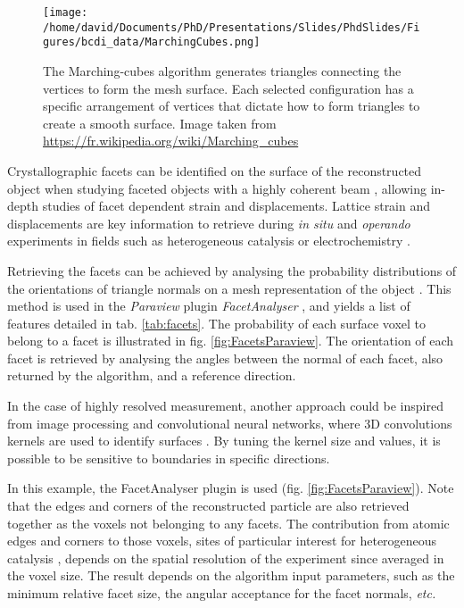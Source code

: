 \begin{figure}[!htb]
    \centering
    \texttt{[image: /home/david/Documents/PhD/Presentations/Slides/PhdSlides/Figures/bcdi\_data/MarchingCubes.png]}
    \caption{
    The Marching-cubes algorithm generates triangles connecting the vertices to form the mesh surface.
    Each selected configuration has a specific arrangement of vertices that dictate how to form triangles to create a smooth surface.
    Image taken from \url{https://fr.wikipedia.org/wiki/Marching_cubes}
    }
    \label{fig:MarchingCubes}
\end{figure}

Crystallographic facets can be identified on the surface of the reconstructed object when studying faceted objects with a highly coherent beam \parencite{Richard2018}, allowing in-depth studies of facet dependent strain and displacements.
Lattice strain and displacements are key information to retrieve during \textit{in situ} and \textit{operando} experiments in fields such as heterogeneous catalysis \parencite{Ulvestad2016, Yau2017a, Kim2018, Fernandez2019, Abuin2019, Kim2019, Kawaguchi2019, Suzana2019, Choi2020, Passos2020,  Kim2021, Carnis2021, Dupraz2022} or electrochemistry \parencite{Ulvestad2015a, Bjorling2019, Vicente2021, Kawaguchi2021, Carnis2021b, Atlan2023}.

Retrieving the facets can be achieved by analysing the probability distributions of the orientations of triangle normals on a mesh representation of the object \parencite{Grothausmann2012}.
This method is used in the \textit{Paraview} plugin \textit{FacetAnalyser} \parencite{Grothausmann2015}, and yields a list of features detailed in tab. \ref{tab:facets}.
The probability of each surface voxel to belong to a facet is illustrated in fig. \ref{fig:FacetsParaview}.
The orientation of each facet is retrieved by analysing the angles between the normal of each facet, also returned by the algorithm, and a reference direction.

In the case of highly resolved measurement, another approach could be inspired from image processing and convolutional neural networks, where 3D convolutions kernels are used to identify surfaces \parencite{RaschkaMirjalili2019}.
By tuning the kernel size and values, it is possible to be sensitive to boundaries in specific directions.

In this example, the FacetAnalyser plugin is used (fig. \ref{fig:FacetsParaview}).
Note that the edges and corners of the reconstructed particle are also retrieved together as the voxels not belonging to any facets.
The contribution from atomic edges and corners to those voxels, sites of particular interest for heterogeneous catalysis \parencite{Taylor1925}, depends on the spatial resolution of the experiment since averaged in the voxel size.
The result depends on the algorithm input parameters, such as the minimum relative facet size, the angular acceptance for the facet normals, \textit{etc.}

